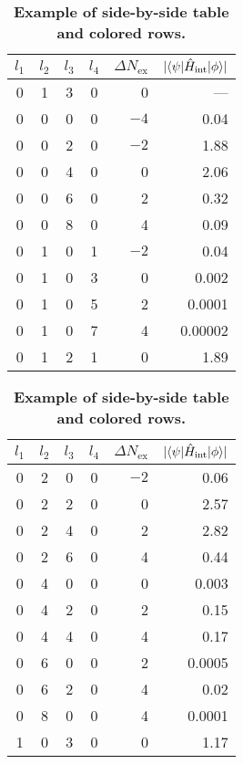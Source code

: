 \begin{table}
	\centering 
	\caption{\textbf{Example of side-by-side table and colored rows.} \blindtext}
	\label{tab:table2}
	\vspace{5ex}
	\begin{tabular}{ccccrr} 
		\toprule
		$l_1$ & $l_2$ & $l_3$ & $l_4$ & $\Delta N_\text{ex}$ & $|\langle \psi | \hat{H}_\text{int} | \phi \rangle|$  \\ 
		\midrule 
		\rowcolor{pqred} 0 & 1 & 3 & 0 & 0 & ---\\
		0 & 0 & 0 & 0 & $-4$ & 0.04\\
		0 & 0 & 2 & 0 & $-2$ & 1.88\\
		\rowcolor{pqblue} 0 & 0 & 4 & 0 & 0 & 2.06\\
		0 & 0 & 6 & 0 & 2 & 0.32\\
		0 & 0 & 8 & 0 & 4 & 0.09\\
		0 & 1 & 0 & 1 & $-2$ & 0.04\\
		\rowcolor{pqyellow} 0 & 1 & 0 & 3 & 0 & 0.002\\
		0 & 1 & 0 & 5 & 2 & 0.0001\\
		0 & 1 & 0 & 7 & 4 & 0.00002\\
		\rowcolor{pqblue} 0 & 1 & 2 & 1 & 0 & 1.89\\
		\bottomrule
	\end{tabular}
	\hspace{0.5cm}
	\begin{tabular}{ccccrr} 
		\toprule
		$l_1$ & $l_2$ & $l_3$ & $l_4$ & $\Delta N_\text{ex}$ & $|\langle \psi | \hat{H}_\text{int} | \phi \rangle|$  \\ 
		\midrule 
		0 & 2 & 0 & 0 & $-2$ & 0.06\\
		\rowcolor{pqblue} 0 & 2 & 2 & 0 & 0 & 2.57\\
		0 & 2 & 4 & 0 & 2 & 2.82\\
		0 & 2 & 6 & 0 & 4 & 0.44\\
		\rowcolor{pqyellow} 0 & 4 & 0 & 0 & 0 & 0.003\\
		0 & 4 & 2 & 0 & 2 & 0.15\\
		0 & 4 & 4 & 0 & 4 & 0.17\\
		0 & 6 & 0 & 0 & 2 & 0.0005\\
		0 & 6 & 2 & 0 & 4 & 0.02\\
		0 & 8 & 0 & 0 & 4 & 0.0001\\
		\rowcolor{pqblue} 1 & 0 & 3 & 0 & 0 & 1.17\\
		\bottomrule
	\end{tabular}
\end{table}





